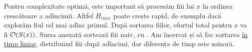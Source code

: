 \documentclass[../main.tex]{subfiles}
\begin{document}
Pentru complexitate optimă, este important să procesăm fiii lui $x$ în ordinea crescătoare a adîncimii. Altfel $H_{max}$ poate crește rapid, de exemplu dacă explorăm fiul cel mai adînc primul. După sortarea fiilor, efortul total pentru $x$ va fi $\mathcal{O}(S(x))$. Sursa anexată sortează fiii naiv, cu . Am încercat și să fac sortarea \href{https://kilonova.ro/submissions/1162662}{în timp liniar}, distribuind fiii după adîncimi, dar diferența de timp este minoră.
\end{document}
